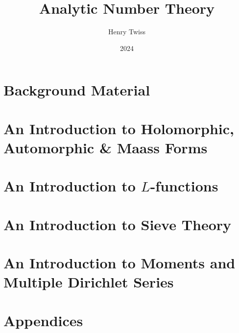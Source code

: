 \documentclass[12pt,oneside]{book}
\title{Analytic Number Theory}
\author{Henry Twiss}
\date{2024}
\begin{document}
\maketitle
\pagestyle{empty}
\tableofcontents
\setcounter{page}{0}
\pagestyle{fancy}

\part{Background Material}
  

\part{An Introduction to Holomorphic, Automorphic \& Maass Forms}
  
  
  
  

\part{An Introduction to \texorpdfstring{$L$}{L}-functions}
  
  
  

\part{An Introduction to Sieve Theory}
  
  

\part{An Introduction to Moments and Multiple Dirichlet Series}
  
  

\part{Appendices}
  

\printindex


\end{document}
